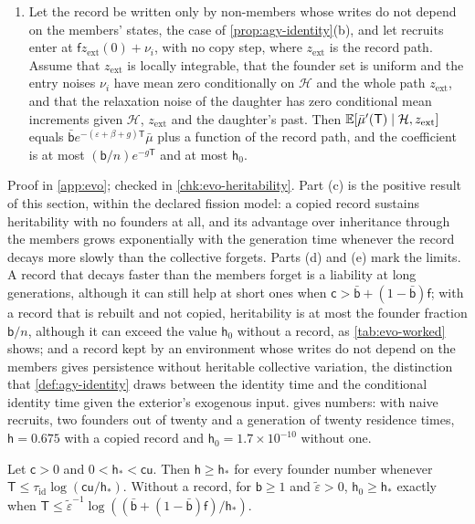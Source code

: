 \begin{theorem}
\begin{enumerate}
\item[(e)] Let the record be written only by non-members whose writes do not depend on the members' states, the case of \cref{prop:agy-identity}(b), and let recruits enter at $\mathsf fz_{\mathrm{ext}}(0)+\nu_i$, with no copy step, where $z_{\mathrm{ext}}$ is the record path. Assume that $z_{\mathrm{ext}}$ is locally integrable, that the founder set is uniform and the entry noises $\nu_i$ have mean zero conditionally on $\mathcal H$ and the whole path $z_{\mathrm{ext}}$, and that the relaxation noise of the daughter has zero conditional mean increments given $\mathcal H$, $z_{\mathrm{ext}}$ and the daughter's past. Then $\mathbb{E}[\bar\mu'(\mathsf T)\mid\mathcal H,z_{\mathrm{ext}}]$ equals $\bar{\mathsf b}e^{-(\varepsilon+\beta+g)\mathsf T}\bar\mu$ plus a function of the record path, and the coefficient is at most $(\mathsf b/n)e^{-g\mathsf T}$ and at most $\mathsf h_0$.
\end{enumerate}
\end{theorem}

Proof in \cref{app:evo}; checked in \cref{chk:evo-heritability}. Part (c) is the positive result of this section, within the declared fission model: a copied record sustains heritability with no founders at all, and its advantage over inheritance through the members grows exponentially with the generation time whenever the record decays more slowly than the collective forgets. Parts (d) and (e) mark the limits. A record that decays faster than the members forget is a liability at long generations, although it can still help at short ones when $\mathsf c>\bar{\mathsf b}+(1-\bar{\mathsf b})\mathsf f$; with a record that is rebuilt and not copied, heritability is at most the founder fraction $\mathsf b/n$, although it can exceed the value $\mathsf h_0$ without a record, as \cref{tab:evo-worked} shows; and a record kept by an environment whose writes do not depend on the members gives persistence without heritable collective variation, the distinction that \cref{def:agy-identity} draws between the identity time and the conditional identity time given the exterior's exogenous input.  gives numbers: with naive recruits, two founders out of twenty and a generation of twenty residence times, $\mathsf h=0.675$ with a copied record and $\mathsf h_0=1.7\times10^{-10}$ without one.

\begin{corollary}\label{cor:evo-horizon}
Let $\mathsf c>0$ and $0<\mathsf h_\ast<\mathsf c\mathsf u$. Then $\mathsf h\ge\mathsf h_\ast$ for every founder number whenever $\mathsf T\le\tau_{\mathrm{id}}\log(\mathsf c\mathsf u/\mathsf h_\ast)$. Without a record, for $\mathsf b\ge1$ and $\tilde\varepsilon>0$, $\mathsf h_0\ge\mathsf h_\ast$ exactly when $\mathsf T\le\tilde\varepsilon^{-1}\log((\bar{\mathsf b}+(1-\bar{\mathsf b})\mathsf f)/\mathsf h_\ast)$.
\end{corollary}

